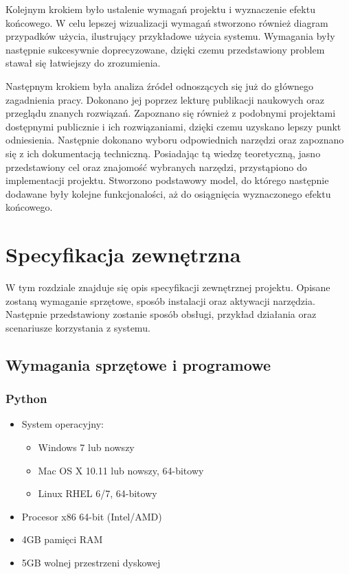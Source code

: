 \documentclass[a4paper,twoside,12pt]{book}
\begin{document}
{{Kolejnym krokiem było ustalenie wymagań projektu i wyznaczenie efektu końcowego. W celu lepszej wizualizacji wymagań stworzono również diagram przypadków użycia, ilustrujący przykładowe użycia systemu. Wymagania były następnie sukcesywnie  doprecyzowane, dzięki czemu przedstawiony problem stawał się łatwiejszy do zrozumienia.}

{Następnym krokiem była analiza źródeł odnoszących się już do głównego zagadnienia pracy. Dokonano jej poprzez lekturę publikacji naukowych oraz przeglądu znanych rozwiązań. Zapoznano się również z podobnymi projektami dostępnymi publicznie i ich rozwiązaniami, dzięki czemu uzyskano lepszy punkt odniesienia. Następnie dokonano wyboru odpowiednich narzędzi oraz zapoznano się z ich dokumentacją techniczną.}
{Posiadając tą wiedzę teoretyczną, jasno przedstawiony cel oraz znajomość wybranych narzędzi, przystąpiono do implementacji projektu. Stworzono podstawowy model, do którego następnie dodawane były kolejne funkcjonalości, aż do osiągnięcia wyznaczonego efektu końcowego.}







\chapter{Specyfikacja zewnętrzna}
{W tym rozdziale znajduje się opis specyfikacji zewnętrznej projektu. Opisane zostaną wymaganie sprzętowe, sposób instalacji oraz aktywacji narzędzia. Następnie przedstawiony zostanie sposób obsługi, przykład działania oraz scenariusze korzystania z systemu.}


\section{ Wymagania sprzętowe i programowe}
\subsection{Python }
\begin{itemize}
\item {System operacyjny:}
\begin{itemize}
\item {Windows 7 lub nowszy}
\item {Mac OS X 10.11 lub nowszy, 64-bitowy}
\item {Linux RHEL 6/7, 64-bitowy}
\end{itemize}
\item{Procesor x86 64-bit  (Intel/AMD)}
\item{4GB pamięci RAM}
\item{5GB wolnej przestrzeni dyskowej}
\end{itemize}

}
\end{document}
